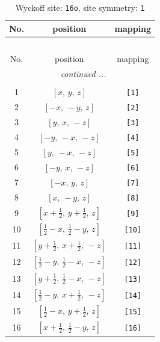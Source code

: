 \documentclass[fleqn,8pt]{jsarticle}
\begin{document}
\begin{longtable}{ccc}
\caption{Wyckoff site: {\tt 16o}, site symmetry: {\tt 1}}
 \\
 \hline \hline
No. & position & mapping \\ \hline \endfirsthead

\multicolumn{2}{l}{\tablename\ \thetable{}} \\
 \hline \hline
No. & position & mapping \\ \hline \endhead

 \hline \hline
\multicolumn{2}{r}{\footnotesize\it continued ...} \\ \endfoot

 \hline \hline
\multicolumn{2}{r}{} \\ \endlastfoot

1 & $\left[ x,\, y,\, z \right]$ & {\tt [1]} \\ \hline
2 & $\left[ - x,\, - y,\, z \right]$ & {\tt [2]} \\ \hline
3 & $\left[ y,\, x,\, - z \right]$ & {\tt [3]} \\ \hline
4 & $\left[ - y,\, - x,\, - z \right]$ & {\tt [4]} \\ \hline
5 & $\left[ y,\, - x,\, - z \right]$ & {\tt [5]} \\ \hline
6 & $\left[ - y,\, x,\, - z \right]$ & {\tt [6]} \\ \hline
7 & $\left[ - x,\, y,\, z \right]$ & {\tt [7]} \\ \hline
8 & $\left[ x,\, - y,\, z \right]$ & {\tt [8]} \\ \hline
9 & $\left[ x + \frac{1}{2},\, y + \frac{1}{2},\, z \right]$ & {\tt [9]} \\ \hline
10 & $\left[ \frac{1}{2} - x,\, \frac{1}{2} - y,\, z \right]$ & {\tt [10]} \\ \hline
11 & $\left[ y + \frac{1}{2},\, x + \frac{1}{2},\, - z \right]$ & {\tt [11]} \\ \hline
12 & $\left[ \frac{1}{2} - y,\, \frac{1}{2} - x,\, - z \right]$ & {\tt [12]} \\ \hline
13 & $\left[ y + \frac{1}{2},\, \frac{1}{2} - x,\, - z \right]$ & {\tt [13]} \\ \hline
14 & $\left[ \frac{1}{2} - y,\, x + \frac{1}{2},\, - z \right]$ & {\tt [14]} \\ \hline
15 & $\left[ \frac{1}{2} - x,\, y + \frac{1}{2},\, z \right]$ & {\tt [15]} \\ \hline
16 & $\left[ x + \frac{1}{2},\, \frac{1}{2} - y,\, z \right]$ & {\tt [16]} \\
\end{longtable}
\end{document}
